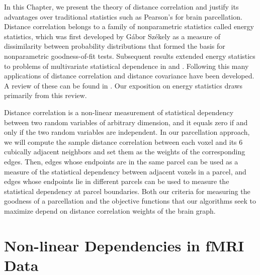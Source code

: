 
In this Chapter, we present the theory of distance correlation and
justify its advantages over traditional statistics such as Pearson's
for brain parcellation. Distance correlation belongs to a family of
nonparametric statistics called energy statistics, which was first
developed by G\'{a}bor Sz\'{e}kely as a measure of dissimilarity between
probability distributions that formed the basis for nonparametric
goodness-of-fit tests. Subsequent results extended energy statistics
to problems of multivariate statistical dependence in
\cite{szekely2007measuring} and \cite{bakirov2006multivariate}.
Following this many applications of distance correlation and distance
covariance have been developed. A review of these can be found in
\cite{szekely2013energy}. Our exposition on energy statistics draws
primarily from this review.

Distance correlation is a non-linear measurement of statistical
dependency between two random variables of arbitrary dimension, and it
equals zero if and only if the two random variables are independent.
In our parcellation approach, we will compute the sample distance
correlation between each voxel and its 6 cubically adjacent neighbors
and set them as the weights of the corresponding edges. Then, edges
whose endpoints are in the same parcel can be used as a measure of the
statistical dependency between adjacent voxels in a parcel, and edges
whose endpoints lie in different parcels can be used to measure the
statistical dependency at parcel boundaries. Both our criteria for
measuring the goodness of a parcellation and the objective functions
that our algorithms seek to maximize depend on distance correlation
weights of the brain graph.

\section{Non-linear Dependencies in fMRI Data}

